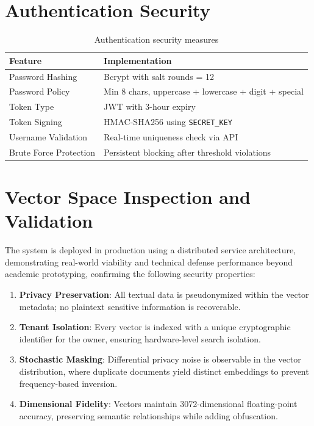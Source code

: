 \section{Authentication Security}

\begin{table}[H]
\centering
\caption{Authentication security measures}
\label{tab:auth}
\begin{tabular}{ll}
\toprule
\textbf{Feature} & \textbf{Implementation} \\
\midrule
Password Hashing & Bcrypt with salt rounds = 12 \\
Password Policy & Min 8 chars, uppercase + lowercase + digit + special \\
Token Type & JWT with 3-hour expiry \\
Token Signing & HMAC-SHA256 using \texttt{SECRET\_KEY} \\
Username Validation & Real-time uniqueness check via API \\
Brute Force Protection & Persistent blocking after threshold violations \\
\bottomrule
\end{tabular}
\end{table}

\section{Vector Space Inspection and Validation}

The system is deployed in production using a distributed service architecture, demonstrating real-world viability and technical defense performance beyond academic prototyping, confirming the following security properties:

\begin{enumerate}
    \item \textbf{Privacy Preservation}: All textual data is pseudonymized within the vector metadata; no plaintext sensitive information is recoverable.
    \item \textbf{Tenant Isolation}: Every vector is indexed with a unique cryptographic identifier for the owner, ensuring hardware-level search isolation.
    \item \textbf{Stochastic Masking}: Differential privacy noise is observable in the vector distribution, where duplicate documents yield distinct embeddings to prevent frequency-based inversion.
    \item \textbf{Dimensional Fidelity}: Vectors maintain 3072-dimensional floating-point accuracy, preserving semantic relationships while adding obfuscation.
\end{enumerate}

